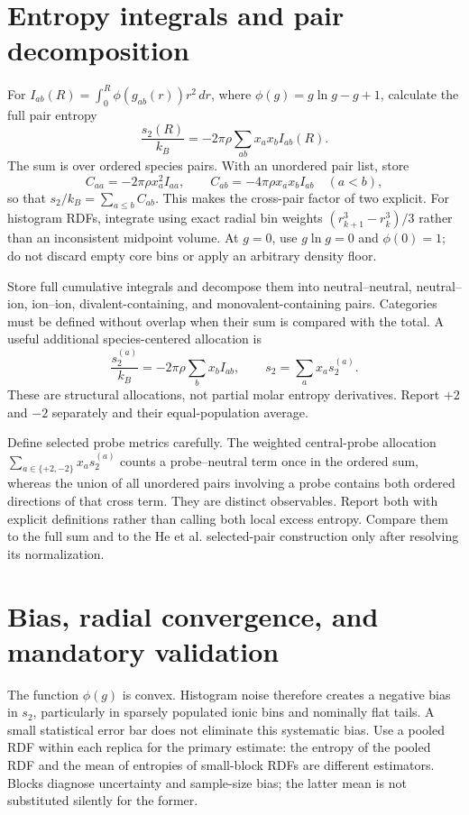 \documentclass[11pt,a4paper]{article}
\begin{document}
\section{Entropy integrals and pair decomposition}
For $I_{ab}(R)=\int_0^R\phi(g_{ab}(r))r^2\,dr$, where
$\phi(g)=g\ln g-g+1$, calculate the full pair entropy
\begin{equation}
\frac{s_2(R)}{k_B}=-2\pi\rho\sum_{ab}x_ax_b I_{ab}(R).
\end{equation}
The sum is over ordered species pairs. With an unordered pair list, store
\begin{equation}
C_{aa}=-2\pi\rho x_a^2 I_{aa},\qquad
C_{ab}=-4\pi\rho x_ax_b I_{ab}\quad(a<b),
\end{equation}
so that $s_2/k_B=\sum_{a\le b}C_{ab}$. This makes the cross-pair factor of two
explicit. For histogram RDFs, integrate using exact radial bin weights
$(r_{k+1}^3-r_k^3)/3$ rather than an inconsistent midpoint volume.
At $g=0$, use $g\ln g=0$ and $\phi(0)=1$; do not discard empty core bins or
apply an arbitrary density floor.

Store full cumulative integrals and decompose them into neutral--neutral,
neutral--ion, ion--ion, divalent-containing, and monovalent-containing pairs.
Categories must be defined without overlap when their sum is compared with
the total. A useful additional species-centered allocation is
\begin{equation}
\frac{s_2^{(a)}}{k_B}=-2\pi\rho\sum_bx_b I_{ab},\qquad
s_2=\sum_ax_as_2^{(a)}.
\end{equation}
These are structural allocations, not partial molar entropy derivatives.
Report $+2$ and $-2$ separately and their equal-population average.

Define selected probe metrics carefully. The weighted central-probe allocation
$\sum_{a\in\{+2,-2\}}x_as_2^{(a)}$ counts a probe--neutral term once in
the ordered sum, whereas the union of all unordered pairs involving a probe
contains both ordered directions of that cross term. They are distinct
observables. Report both with explicit definitions rather than calling both
local excess entropy. Compare them to the full sum and to the He et al.
selected-pair construction only after resolving its normalization.

\section{Bias, radial convergence, and mandatory validation}
The function $\phi(g)$ is convex. Histogram noise therefore creates a negative
bias in $s_2$, particularly in sparsely populated ionic bins and nominally flat
tails. A small statistical error bar does not eliminate this systematic bias.
Use a pooled RDF within each replica for the primary estimate: the entropy of
the pooled RDF and the mean of entropies of small-block RDFs are different
estimators. Blocks diagnose uncertainty and sample-size bias; the latter mean
is not substituted silently for the former.
\end{document}

